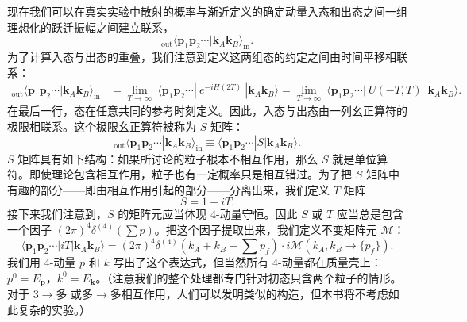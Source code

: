 现在我们可以在真实实验中散射的概率与渐近定义的确定动量入态和出态之间一组理想化的跃迁振幅之间建立联系，
\begin{equation}
  {}_{\mathrm{out}}\langle \mathbf{p}_1\mathbf{p}_2\cdots
    |\mathbf{k}_A\mathbf{k}_B\rangle_{\mathrm{in}} .
  \label{eq:4.69}
\end{equation}
为了计算入态与出态的重叠，我们注意到定义这两组态的约定之间由时间平移相联系：
\begin{equation}
  \begin{aligned}
    {}_{\mathrm{out}}\langle \mathbf{p}_1\mathbf{p}_2\cdots
      |\mathbf{k}_A\mathbf{k}_B\rangle_{\mathrm{in}}
    &= \lim_{T\to\infty}\ \langle \mathbf{p}_1\mathbf{p}_2\cdots|
      \ e^{-iH(2T)}\ |\mathbf{k}_A\mathbf{k}_B\rangle
    = \lim_{T\to\infty}\ \langle \mathbf{p}_1\mathbf{p}_2\cdots|
      \ U(-T,T)\ |\mathbf{k}_A\mathbf{k}_B\rangle .
  \end{aligned}
  \label{eq:4.70}
\end{equation}
在最后一行，态在任意共同的参考时刻定义。因此，入态与出态由一列幺正算符的极限相联系。这个极限幺正算符被称为 $S$ 矩阵：
\begin{equation}
  {}_{\mathrm{out}}\langle \mathbf{p}_1\mathbf{p}_2\cdots
    |\mathbf{k}_A\mathbf{k}_B\rangle_{\mathrm{in}}
  \equiv \langle \mathbf{p}_1\mathbf{p}_2\cdots|S|\mathbf{k}_A\mathbf{k}_B\rangle .
  \label{eq:4.71}
\end{equation}
$S$ 矩阵具有如下结构：如果所讨论的粒子根本不相互作用，那么 $S$ 就是单位算符。即使理论包含相互作用，粒子也有一定概率只是相互错过。为了把 $S$ 矩阵中有趣的部分——即由相互作用引起的部分——分离出来，我们定义 $T$ 矩阵
\begin{equation}
  S = 1 + iT .
  \label{eq:4.72}
\end{equation}
接下来我们注意到，$S$ 的矩阵元应当体现 4-动量守恒。因此 $S$ 或 $T$ 应当总是包含一个因子 $(2\pi)^4\delta^{(4)}(\sum p)$。把这个因子提取出来，我们定义不变矩阵元 $\mathcal{M}$：
\begin{equation}
  \langle \mathbf{p}_1\mathbf{p}_2\cdots|iT|\mathbf{k}_A\mathbf{k}_B\rangle
    = (2\pi)^4\delta^{(4)}(k_A+k_B-\textstyle\sum p_f)
      \cdot i\mathcal{M}(k_A, k_B \to \{p_f\}) .
  \label{eq:4.73}
\end{equation}
我们用 4-动量 $p$ 和 $k$ 写出了这个表达式，但当然所有 4-动量都在质量壳上：$p^0 = E_{\mathbf{p}}$，$k^0 = E_{\mathbf{k}}$。（注意我们的整个处理都专门针对初态只含两个粒子的情形。对于 $3\to$多 或多$\to$多相互作用，人们可以发明类似的构造，但本书将不考虑如此复杂的实验。）

